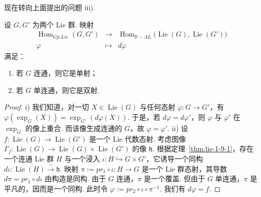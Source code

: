 现在转向上面提出的问题 iii).

\begin{theorem}\label{thm:lie-1-9-2}
设 $G,G'$ 为两个 Lie 群. 映射
\[
\begin{array}{rcl}
\operatorname{Hom}_{Gp.Lie}(G,G') & \longrightarrow & \operatorname{Hom}_{\mathbb R-AL}\bigl(\operatorname{Lie}(G),\operatorname{Lie}(G')\bigr)\\[2pt]
\varphi & \longmapsto & d\varphi
\end{array}
\]
满足：
\begin{enumerate}[label=\roman*)]
\item 若 $G$ 连通，则它是单射；
\item 若 $G$ 单连通，则它是双射.
\end{enumerate}
\end{theorem}

\begin{proof}
i) 我们知道，对一切 $X\in\operatorname{Lie}(G)$ 与任何态射 $\varphi:G\longrightarrow G'$，有 $\varphi(\exp_{G}(X))=\exp_{G'}(d\varphi(X))$. 于是，若 $d\varphi=d\varphi'$，则 $\varphi$ 与 $\varphi'$ 在 $\exp_{G}$ 的像上重合. 而该像生成连通的 $G$，故 $\varphi=\varphi'$.
ii) 设 $f:\operatorname{Lie}(G)\longrightarrow\operatorname{Lie}(G')$ 是一个 Lie 代数态射. 考虑图像 $\Gamma_{f}:\operatorname{Lie}(G)\longrightarrow\operatorname{Lie}(G)\times\operatorname{Lie}(G')$ 的像 $\mathfrak h$. 根据定理~\ref{thm:lie-1-9-1}，存在一个连通 Lie 群 $H$ 与一个浸入 $\iota:H\hookrightarrow G\times G'$，它诱导一个同构 $d\iota:\operatorname{Lie}(H)\xrightarrow{\ \sim\ }\mathfrak h$. 映射 $\pi:=pr_{1}\circ\iota:H\longrightarrow G$ 是一个 Lie 群态射，其导数 $d\pi=pr_{1}\circ d\iota$ 由构造是同构. 由于 $G$ 连通，$\pi$ 是一个覆盖. 但由于 $G$ 单连通，$\pi$ 是平凡的，因而是一个同构. 此时令 $\varphi:=pr_{2}\circ\iota\circ\pi^{-1}$. 我们有 $d\varphi=f$.
\end{proof}

